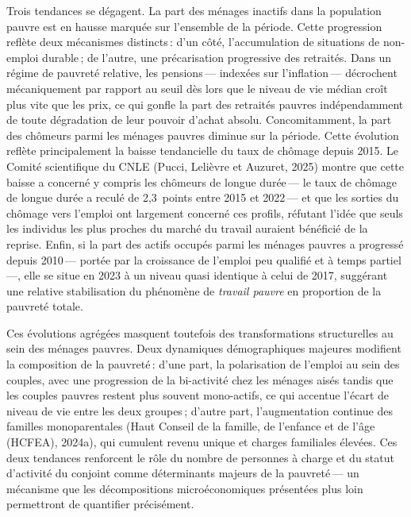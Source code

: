 \documentclass[
  french,
  9pt,
  a4paper,
]{article}
\begin{document}
Trois tendances se dégagent. La part des ménages inactifs dans la
population pauvre est en hausse marquée sur l'ensemble de la période.
Cette progression reflète deux mécanismes distincts\,: d'un côté,
l'accumulation de situations de non-emploi durable\,; de l'autre, une
précarisation progressive des retraités. Dans un régime de pauvreté
relative, les pensions\,--- indexées sur l'inflation\,--- décrochent
mécaniquement par rapport au seuil dès lors que le niveau de vie médian
croît plus vite que les prix, ce qui gonfle la part des retraités
pauvres indépendamment de toute dégradation de leur pouvoir d'achat
absolu. Concomitamment, la part des chômeurs parmi les ménages pauvres
diminue sur la période. Cette évolution reflète principalement la baisse
tendancielle du taux de chômage depuis 2015. Le Comité scientifique du
CNLE (Pucci, Lelièvre et Auzuret, 2025) montre que cette baisse a
concerné y compris les chômeurs de longue durée\,--- le taux de chômage
de longue durée a reculé de 2,3~points entre 2015 et 2022\,--- et que
les sorties du chômage vers l'emploi ont largement concerné ces profils,
réfutant l'idée que seuls les individus les plus proches du marché du
travail auraient bénéficié de la reprise. Enfin, si la part des actifs
occupés parmi les ménages pauvres a progressé depuis 2010\,--- portée
par la croissance de l'emploi peu qualifié et à temps partiel\,---, elle
se situe en 2023 à un niveau quasi identique à celui de 2017, suggérant
une relative stabilisation du phénomène de \emph{travail pauvre} en
proportion de la pauvreté totale.

Ces évolutions agrégées masquent toutefois des transformations
structurelles au sein des ménages pauvres. Deux dynamiques
démographiques majeures modifient la composition de la pauvreté\,: d'une
part, la polarisation de l'emploi au sein des couples, avec une
progression de la bi-activité chez les ménages aisés tandis que les
couples pauvres restent plus souvent mono-actifs, ce qui accentue
l'écart de niveau de vie entre les deux groupes\,; d'autre part,
l'augmentation continue des familles monoparentales (Haut Conseil de la
famille, de l'enfance et de l'âge (HCFEA), 2024a), qui cumulent revenu
unique et charges familiales élevées. Ces deux tendances renforcent le
rôle du nombre de personnes à charge et du statut d'activité du conjoint
comme déterminants majeurs de la pauvreté\,--- un mécanisme que les
décompositions microéconomiques présentées plus loin permettront de
quantifier précisément.
\end{document}
